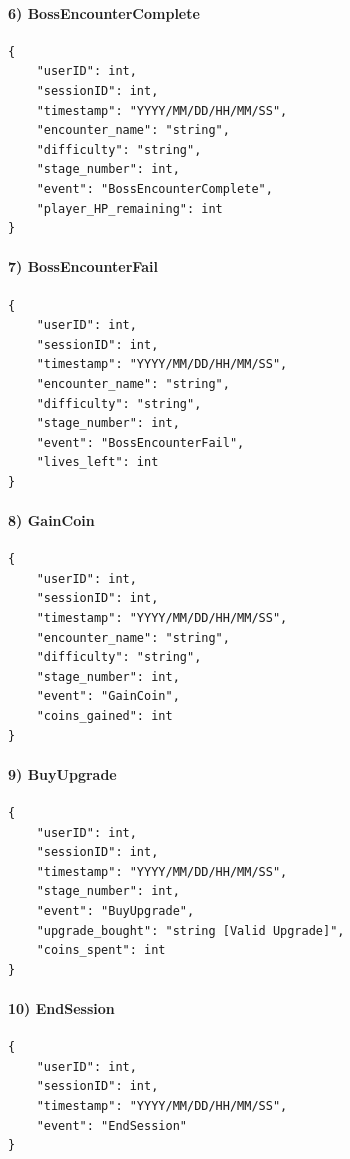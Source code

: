 \paragraph{6) BossEncounterComplete}
\begin{verbatim}
{
    "userID": int,
    "sessionID": int,
    "timestamp": "YYYY/MM/DD/HH/MM/SS",
    "encounter_name": "string",
    "difficulty": "string",
    "stage_number": int,
    "event": "BossEncounterComplete",
    "player_HP_remaining": int
}
\end{verbatim}

\paragraph{7) BossEncounterFail}
\begin{verbatim}
{
    "userID": int,
    "sessionID": int,
    "timestamp": "YYYY/MM/DD/HH/MM/SS",
    "encounter_name": "string",
    "difficulty": "string",
    "stage_number": int,
    "event": "BossEncounterFail",
    "lives_left": int
}
\end{verbatim}

\newpage
\paragraph{8) GainCoin}
\begin{verbatim}
{
    "userID": int,
    "sessionID": int,
    "timestamp": "YYYY/MM/DD/HH/MM/SS",
    "encounter_name": "string",
    "difficulty": "string",
    "stage_number": int,
    "event": "GainCoin",
    "coins_gained": int
}
\end{verbatim}

\paragraph{9) BuyUpgrade}
\begin{verbatim}
{
    "userID": int,
    "sessionID": int,
    "timestamp": "YYYY/MM/DD/HH/MM/SS",
    "stage_number": int,
    "event": "BuyUpgrade",
    "upgrade_bought": "string [Valid Upgrade]",
    "coins_spent": int
}
\end{verbatim}

\paragraph{10) EndSession}
\begin{verbatim}
{
    "userID": int,
    "sessionID": int,
    "timestamp": "YYYY/MM/DD/HH/MM/SS",
    "event": "EndSession"
}
\end{verbatim}

